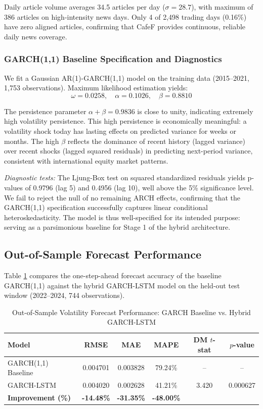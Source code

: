 Daily article volume averages 34.5 articles per day ($\sigma = 28.7$), with maximum of 386 articles on high-intensity news days. Only 4 of 2,498 trading days (0.16\%) have zero aligned articles, confirming that CafeF provides continuous, reliable daily news coverage.

\subsubsection{GARCH(1,1) Baseline Specification and Diagnostics}

We fit a Gaussian AR(1)-GARCH(1,1) model on the training data (2015--2021, 1,753 observations). Maximum likelihood estimation yields:
$$\omega = 0.0258, \quad \alpha = 0.1026, \quad \beta = 0.8810$$

The persistence parameter $\alpha + \beta = 0.9836$ is close to unity, indicating extremely high volatility persistence. This high persistence is economically meaningful: a volatility shock today has lasting effects on predicted variance for weeks or months. The high $\beta$ reflects the dominance of recent history (lagged variance) over recent shocks (lagged squared residuals) in predicting next-period variance, consistent with international equity market patterns.

\textit{Diagnostic tests:} The Ljung-Box test on squared standardized residuals yields p-values of 0.9796 (lag 5) and 0.4956 (lag 10), well above the 5\% significance level. We fail to reject the null of no remaining ARCH effects, confirming that the GARCH(1,1) specification successfully captures linear conditional heteroskedasticity. The model is thus well-specified for its intended purpose: serving as a parsimonious baseline for Stage 1 of the hybrid architecture.

\subsection{Out-of-Sample Forecast Performance}

Table \ref{tab:forecasting_results} compares the one-step-ahead forecast accuracy of the baseline GARCH(1,1) against the hybrid GARCH-LSTM model on the held-out test window (2022--2024, 744 observations).

\begin{table}[htbp]
    \centering
    \caption{Out-of-Sample Volatility Forecast Performance: GARCH Baseline vs. Hybrid GARCH-LSTM}
    \label{tab:forecasting_results}
    \begin{tabular}{lccccc}
        \toprule
        Model & RMSE & MAE & MAPE & DM $t$-stat & $p$-value \\
        \midrule
        GARCH(1,1) Baseline & 0.004701 & 0.003828 & 79.24\% & -- & -- \\
        GARCH-LSTM & 0.004020 & 0.002628 & 41.21\% & 3.420 & 0.000627 \\
        \textbf{Improvement (\%)} & \textbf{-14.48\%} & \textbf{-31.35\%} & \textbf{-48.00\%} & & \\
        \bottomrule
    \end{tabular}
\end{table}

